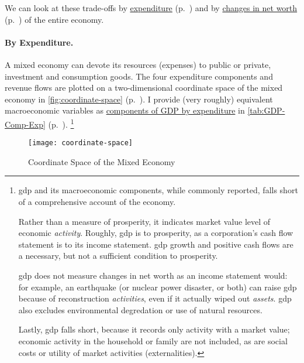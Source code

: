 We can look at these trade-offs by \hyperref[sec:by-expenditure]{expenditure} (p.~\pageref{sec:by-expenditure}) and by \hyperref[sec:delta-net-worth]{changes in net worth} (p.~\pageref{sec:delta-net-worth}) of the entire economy.

\paragraph[By Expenditure]{By Expenditure.}
	\label{sec:by-expenditure}
A mixed economy can devote its resources (expenses) to public or private, investment and consumption goods.
The four expenditure components and revenue flows are plotted on a two-dimensional coordinate space of the mixed economy in \autoref{fig:coordinate-space} (p.~\pageref{fig:coordinate-space}).
I provide (very roughly) equivalent macroeconomic variables as \hyperref[tab:GDP-Comp-Exp]{components of GDP by expenditure} in \autoref{tab:GDP-Comp-Exp} (p.~\pageref{tab:GDP-Comp-Exp}).
\footnote{
	\gls{gdp} and its macroeconomic components, while commonly reported, falls short of a comprehensive account of the economy.

	Rather than a measure of prosperity, it indicates market value level of economic \emph{activity}.
	Roughly, \gls{gdp} is to prosperity, as a corporation's cash flow statement is to its income statement.
	\gls{gdp} growth and positive cash flows are a necessary, but not a sufficient condition to prosperity.

	\gls{gdp} does not measure changes in net worth as an income statement would:
	for example, an earthquake (or nuclear power disaster, or both) can raise \gls{gdp} because of reconstruction \emph{activities}, even if it actually wiped out \emph{assets}.
	\gls{gdp} also excludes environmental degredation or use of natural resources.

	Lastly, \gls{gdp} falls short, because it records only activity with a market value;
	economic activity in the household or family are not included, as are social costs or utility of market activities (externalities).
}

\begin{landscape}
 \begin{figure}[htbp]
	\centering
	\texttt{[image: coordinate-space]}
	\caption{Coordinate Space of the Mixed Economy}
	\label{fig:coordinate-space}
\end{figure} %
\end{landscape}

